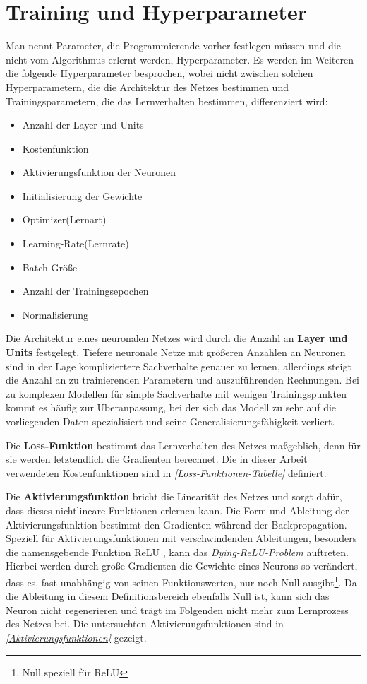 \section{Training und Hyperparameter}
\label{Training und Hyperparameter}
Man nennt Parameter, die Programmierende vorher festlegen müssen und die nicht vom Algorithmus erlernt werden, Hyperparameter. Es werden im Weiteren die folgende Hyperparameter besprochen, wobei nicht zwischen solchen Hyperparametern, die die Architektur des Netzes bestimmen und Trainingsparametern, die das Lernverhalten bestimmen, differenziert wird:
\begin{multicols}{2}
	\begin{itemize}
	\setlength\itemsep{0cm}
	\setlength{\parskip}{0cm}
		\item Anzahl der Layer und Units
		\item Kostenfunktion
		\item Aktivierungsfunktion der Neuronen
		\item Initialisierung der Gewichte
		\item Optimizer(Lernart) 
		\item Learning-Rate(Lernrate)
		\item Batch-Größe
		\item Anzahl der Trainingsepochen
		\item Normalisierung
	\end{itemize}
\end{multicols}
Die Architektur eines neuronalen Netzes wird durch die Anzahl an \textbf{Layer und Units} festgelegt.
Tiefere neuronale Netze mit größeren Anzahlen an Neuronen sind in der Lage kompliziertere Sachverhalte genauer zu lernen, allerdings steigt die Anzahl an zu trainierenden Parametern und auszuführenden Rechnungen. Bei zu komplexen Modellen für simple Sachverhalte mit wenigen Trainingspunkten kommt es häufig zur Überanpassung, bei der sich das Modell zu sehr auf die vorliegenden Daten spezialisiert und seine Generalisierungsfähigkeit verliert.

Die \textbf{Loss-Funktion} bestimmt das Lernverhalten des Netzes maßgeblich, denn für sie werden letztendlich die Gradienten berechnet. Die in dieser Arbeit verwendeten Kostenfunktionen sind in \textit{\autoref{Loss-Funktionen-Tabelle}} definiert. %

Die \textbf{Aktivierungsfunktion} bricht die Linearität des Netzes und sorgt dafür, dass dieses nichtlineare Funktionen erlernen kann.  Die Form und Ableitung der Aktivierungsfunktion bestimmt den Gradienten während der Backpropagation. Speziell für Aktivierungsfunktionen mit verschwindenden Ableitungen, besonders die namensgebende Funktion ReLU \cite{ReLU}, kann das \textit{Dying-ReLU-Problem} auftreten. Hierbei werden durch große Gradienten die Gewichte eines Neurons so verändert, dass es, fast unabhängig von seinen Funktionswerten, nur noch Null ausgibt\footnote{Null speziell für ReLU}. Da die Ableitung in diesem Definitionsbereich ebenfalls Null ist, kann sich das Neuron nicht regenerieren und trägt im Folgenden nicht mehr zum Lernprozess des Netzes bei. Die untersuchten Aktivierungsfunktionen sind in \textit{\autoref{Aktivierungsfunktionen}} gezeigt.

